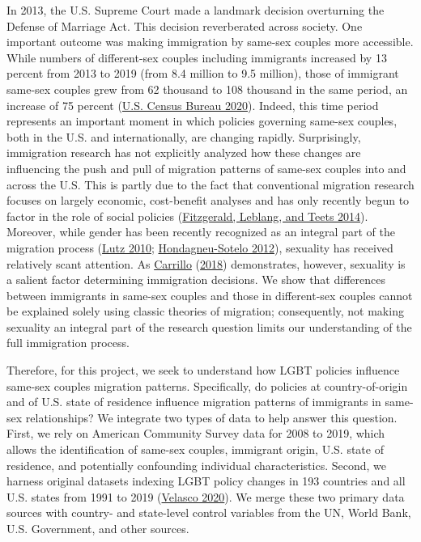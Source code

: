 \documentclass[
  11pt,
]{article}
\begin{document}
In 2013, the U.S. Supreme Court made a landmark decision overturning the Defense of Marriage Act. This decision reverberated across society. One important outcome was making immigration by same-sex couples more accessible. While numbers of different-sex couples including immigrants increased by 13 percent from 2013 to 2019 (from 8.4 million to 9.5 million), those of immigrant same-sex couples grew from 62 thousand to 108 thousand in the same period, an increase of 75 percent (\protect\hyperlink{ref-u.s.censusbureau_2020}{U.S. Census Bureau 2020}). Indeed, this time period represents an important moment in which policies governing same-sex couples, both in the U.S. and internationally, are changing rapidly. Surprisingly, immigration research has not explicitly analyzed how these changes are influencing the push and pull of migration patterns of same-sex couples into and across the U.S. This is partly due to the fact that conventional migration research focuses on largely economic, cost-benefit analyses and has only recently begun to factor in the role of social policies (\protect\hyperlink{ref-fitzgerald_2014}{Fitzgerald, Leblang, and Teets 2014}). Moreover, while gender has been recently recognized as an integral part of the migration process (\protect\hyperlink{ref-lutz_2010}{Lutz 2010}; \protect\hyperlink{ref-hondagneu-sotelo_2012}{Hondagneu-Sotelo 2012}), sexuality has received relatively scant attention. As \protect\hyperlink{ref-carrillo_2018}{Carrillo} (\protect\hyperlink{ref-carrillo_2018}{2018}) demonstrates, however, sexuality is a salient factor determining immigration decisions. We show that differences between immigrants in same-sex couples and those in different-sex couples cannot be explained solely using classic theories of migration; consequently, not making sexuality an integral part of the research question limits our understanding of the full immigration process.

Therefore, for this project, we seek to understand how LGBT policies influence same-sex couples migration patterns. Specifically, do policies at country-of-origin and of U.S. state of residence influence migration patterns of immigrants in same-sex relationships? We integrate two types of data to help answer this question. First, we rely on American Community Survey data for 2008 to 2019, which allows the identification of same-sex couples, immigrant origin, U.S. state of residence, and potentially confounding individual characteristics. Second, we harness original datasets indexing LGBT policy changes in 193 countries and all U.S. states from 1991 to 2019 (\protect\hyperlink{ref-velasco_2020}{Velasco 2020}). We merge these two primary data sources with country- and state-level control variables from the UN, World Bank, U.S. Government, and other sources.
\end{document}
